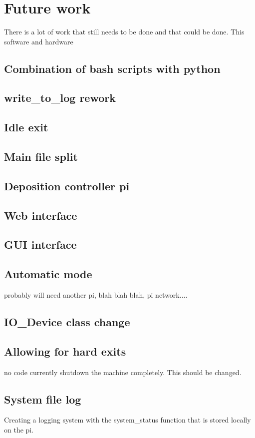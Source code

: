 \documentclass{article}
\begin{document}
\section{Future work}
\label{section:future}
There is a lot of work that still needs to be done and that could be done. This software and hardware

\subsection{Combination of bash scripts with python}
\label{section:picombo}

\subsection{write\_to\_log rework}

\subsection{Idle exit}
\label{section:idleE}

\subsection{Main file split}
\label{section:mainsplit}

\subsection{Deposition controller pi}

\subsection{Web interface}

\subsection{GUI interface}

\subsection{Automatic mode}
\label{section:auto}
probably will need another pi, blah blah blah, pi network....

\subsection{IO\_Device class change}
\label{section:IOclassedit}

\subsection{Allowing for hard exits}
no code currently shutdown the machine completely. This should be changed.

\subsection{System file log}
\label{section:systemstatchange}
Creating a logging system with the system\_status function that is stored locally on the pi.
\end{document}
